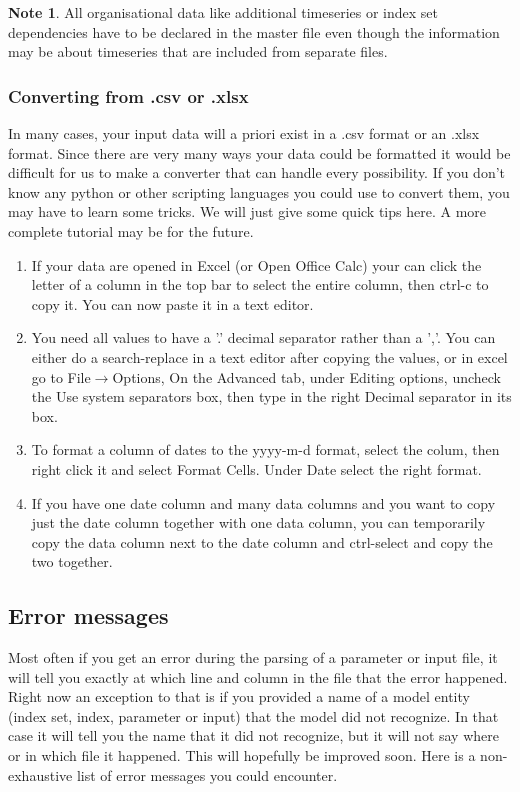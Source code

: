 \documentclass[11pt]{article}
\theoremstyle{definition}
\newtheorem{mynote}{Note}
\newenvironment{note}%
  {\begin{lrbox}{\notebox}%
   \begin{minipage}{\dimexpr\linewidth-2\fboxsep}
   \begin{mynote}}%
  {\end{mynote}%
   \end{minipage}%
   \end{lrbox}%
   \begin{trivlist}
     \item[]\colorbox{silver}{\usebox\notebox}
   \end{trivlist}}
\begin{document}
\begin{note}
All organisational data like additional timeseries or index set dependencies have to be declared in the master file even though the information may be about timeseries that are included from separate files.
\end{note}


\subsubsection{Converting from .csv or .xlsx}
In many cases, your input data will a priori exist in a .csv format or an .xlsx format. Since there are very many ways your data could be formatted it would be difficult for us to make a converter that can handle every possibility. If you don't know any python or other scripting languages you could use to convert them, you may have to learn some tricks. We will just give some quick tips here. A more complete tutorial may be for the future.

\begin{enumerate}[i]
\item If your data are opened in Excel (or Open Office Calc) your can click the letter of a column in the top bar to select the entire column, then ctrl-c to copy it. You can now paste it in a text editor.
\item You need all values to have a '.' decimal separator rather than a ','. You can either do a search-replace in a text editor after copying the values, or in excel go to File$\rightarrow$Options, On the Advanced tab, under Editing options, uncheck the Use system separators box, then type in the right Decimal separator in its box.
\item To format a column of dates to the yyyy-m-d format, select the colum, then right click it and select Format Cells. Under Date select the right format.
\item If you have one date column and many data columns and you want to copy just the date column together with one data column, you can temporarily copy the data column next to the date column and ctrl-select and copy the two together.
\end{enumerate}

\subsection{Error messages}

Most often if you get an error during the parsing of a parameter or input file, it will tell you exactly at which line and column in the file that the error happened. Right now an exception to that is if you provided a name of a model entity (index set, index, parameter or input) that the model did not recognize. In that case it will tell you the name that it did not recognize, but it will not say where or in which file it happened. This will hopefully be improved soon. Here is a non-exhaustive list of error messages you could encounter.
\end{document}
